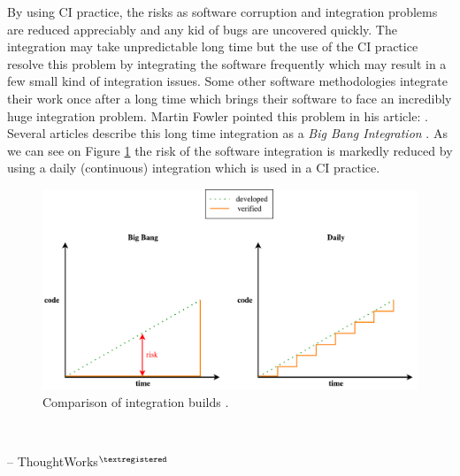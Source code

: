 By using CI practice, the risks as software corruption and integration problems are reduced appreciably and any kid of bugs are uncovered quickly. The integration may take unpredictable long time but the use of the CI practice resolve this problem by integrating the software frequently which may result in a few small kind of integration issues. Some other software methodologies integrate their work once after a long time which brings their software to face an incredibly huge integration problem. Martin Fowler pointed this problem in his article:  \cite{MartinFowler}. Several articles describe this long time integration as a \textit{Big Bang Integration} \cite{AaltoUniversity}. As we can see on Figure \ref{fig:integration} the risk of the software integration is markedly reduced by using a daily (continuous) integration which is used in a CI practice.

\begin{figure}[H]
    \centering
    \includegraphics[scale=0.5]{img/big_bang_vs_daily_build.pdf}
    \caption{Comparison of integration builds \cite{AaltoUniversity}.}
    \label{fig:integration}
\end{figure}

\begin{displayquote}
    \textit{}\\[-2em]
    \begin{flushright}
        -- ThoughtWorks$^{\tiny{\textregistered}}$ \cite{ThoughtWorks}
    \end{flushright}
\end{displayquote}

